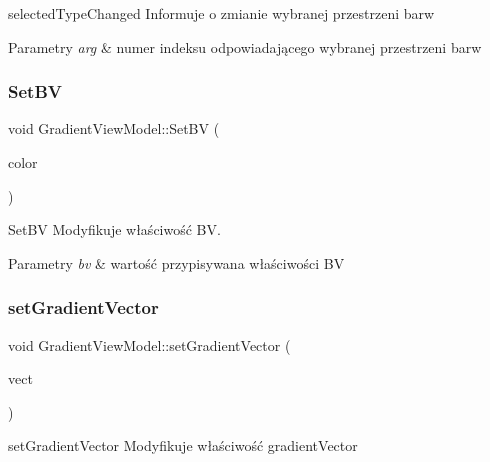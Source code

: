 selected\+Type\+Changed Informuje o zmianie wybranej przestrzeni barw 


\begin{DoxyParams}{Parametry}
{\em arg} & numer indeksu odpowiadającego wybranej przestrzeni barw \\
\hline
\end{DoxyParams}
\mbox{\label{class_gradient_view_model_a20989bc2daaea85e5cc33513af1b2660}} 
\subsubsection{\texorpdfstring{Set\+BV}{SetBV}}
{\footnotesize\ttfamily void Gradient\+View\+Model\+::\+Set\+BV (\begin{DoxyParamCaption}\item[{int}]{color }\end{DoxyParamCaption})\hspace{0.3cm}{\ttfamily [slot]}}



Set\+BV Modyfikuje właściwość BV. 


\begin{DoxyParams}{Parametry}
{\em bv} & wartość przypisywana właściwości BV \\
\hline
\end{DoxyParams}
\mbox{\label{class_gradient_view_model_a44a264b3dfb259c75107dd80b1d7e389}} 
\subsubsection{\texorpdfstring{set\+Gradient\+Vector}{setGradientVector}}
{\footnotesize\ttfamily void Gradient\+View\+Model\+::set\+Gradient\+Vector (\begin{DoxyParamCaption}\item[{Q\+Vector$<$ Q\+String $>$}]{vect }\end{DoxyParamCaption})\hspace{0.3cm}{\ttfamily [slot]}}



set\+Gradient\+Vector Modyfikuje właściwość gradient\+Vector 


